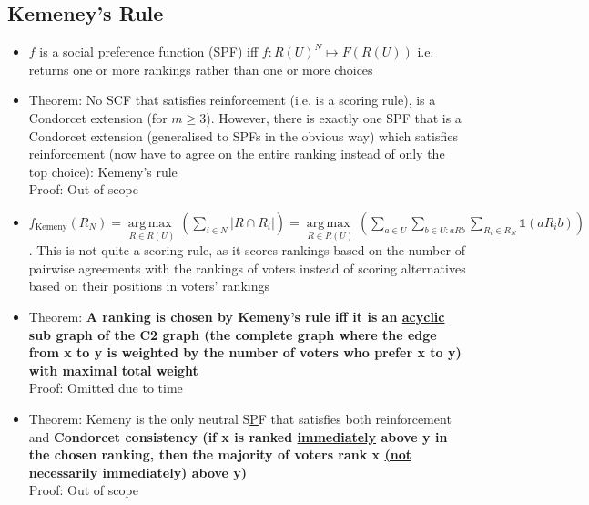 \documentclass[20pt,a4paper,landscape]{extarticle}
\DeclareMathOperator*{\argmax}{arg\,max\:}
\begin{document}
\begin{flushleft}
\subsection{Kemeney's Rule}
\begin{itemize}
\item $f$ is a social preference function (SPF) iff $f: R(U)^N \mapsto F(R(U))$ i.e. returns one or more rankings rather than one or more choices
\item Theorem: No SCF that satisfies reinforcement (i.e. is a scoring rule), is a Condorcet extension (for $m \geq 3$). However, there is exactly one SPF that is a Condorcet extension (generalised to SPFs in the obvious way) which satisfies reinforcement (now have to agree on the entire ranking instead of only the top choice): Kemeny's rule\\
Proof: Out of scope
\item \textbf{$f_{\textrm{Kemeny}}(R_N) = \underset{R \in R(U)}{\argmax}\left(\sum_{i \in N} |R \cap R_i|\right) = \underset{R \in R(U)}{\argmax}\left(\sum_{a \in U} \sum_{b \in U: aRb} \sum_{R_i \in R_N} \mathds{1}(aR_ib)\right)$}. This is not quite a scoring rule, as it scores rankings based on the number of pairwise agreements with the rankings of voters instead of scoring alternatives based on their positions in voters' rankings
\item Theorem: \textbf{A ranking is chosen by Kemeny's rule iff it is an \underline{acyclic} sub graph of the C2 graph (the complete graph where the edge from x to y is weighted by the number of voters who prefer x to y) with maximal total weight}\\
Proof: Omitted due to time
\item Theorem: Kemeny is the only neutral S\underline{P}F that satisfies both reinforcement and \textbf{Condorcet consistency (if x is ranked \underline{immediately} above y in the chosen ranking, then the majority of voters rank x \underline{(not necessarily immediately)} above y)}\\
Proof: Out of scope

\end{itemize}
\end{flushleft}
\end{document}
